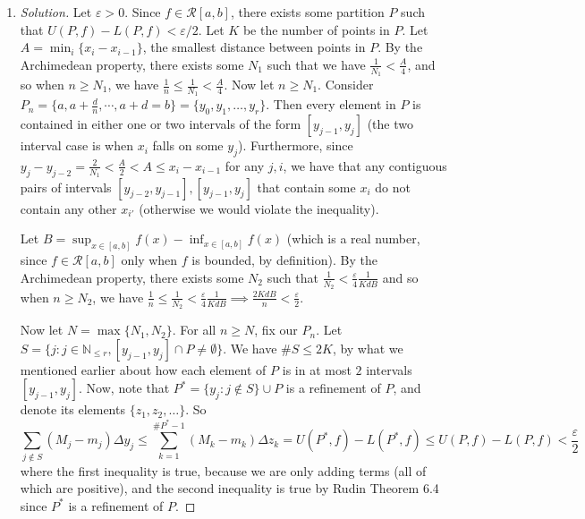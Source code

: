 \documentclass{article}
\newcommand{\N}{{\mathbb N}}
\newcommand{\ep}{{\varepsilon}}
\begin{document}
\begin{enumerate}
	\item \begin{proof}[Solution]\let\qed\relax
			Let $\ep > 0$.
			Since $f \in \mathcal{R}[a,b]$, there exists some
			partition $P$ such that $U(P,f) - L(P,f) < \ep/2$.
			Let $K$ be the number of points in $P$.
			Let $A = \min_{i}\{x_{i} - x_{i-1}\}$, the smallest distance
			between points in $P$.
			By the Archimedean property, there exists some $N_1$ such that
			we have $\frac{1}{N_1} < \frac{A}{4}$,
			and so when $n \geq N_1$, we have $\frac{1}{n} \leq \frac{1}{N_1} < \frac{A}{4}$.
			Now let $n \geq N_1$.
			Consider $P_n = \{a,a+\frac{d}{n},\cdots,a+d=b\} = \{y_0,y_1,\dots, y_r\}$.
			Then every element in $P$ is contained in either one
			or two intervals of the form $[y_{j-1},y_j]$
			(the two interval case is when $x_i$ falls on some $y_j$).
			Furthermore, since $y_j - y_{j-2} = \frac{2}{N_1} < \frac{A}{2}
			< A \leq x_i - x_{i-1}$ for any $j,i$,
			we have that any contiguous pairs of intervals $[y_{j-2},y_{j-1}],[y_{j-1},y_j]$
			that contain some $x_i$ do not contain any other $x_{i'}$
			(otherwise we would violate the inequality).

			Let $B = \sup_{x \in [a,b]} f(x) - \inf_{x \in [a,b]}f(x)$
			(which is a real number, since $f \in \mathcal{R}[a,b]$
			only when $f$ is bounded, by definition).
			By the Archimedean property, there exists some $N_2$ such that
			$\frac{1}{N_2} < \frac{\ep}{4}\frac{1}{KdB}$
			and so when $n \geq N_2$, we have
			$\frac{1}{n} \leq \frac{1}{N_2} < \frac{\ep}{4}\frac{1}{KdB}
			\implies \frac{2KdB}{n} < \frac{\ep}{2}$.
			
			Now let $N = \max\{N_1,N_2\}$.
			For all $n \geq N$, fix our $P_n$.
			Let $S = \{j \colon j\in\N_{\leq r}, [y_{j-1},y_j] \cap P \neq \emptyset\}$.
			We have $\#S \leq 2K$, by what we mentioned earlier about
			how each element of $P$ is in at most $2$ intervals $[y_{j-1},y_j]$.
			Now, note that $P^* = \{y_j \colon j \not\in S\} \cup P$ is a refinement of $P$,
			and denote its elements $\{z_1,z_2,\dots\}$.
			So
			\[
				\sum_{j \not\in S}(M_j - m_j)\Delta y_j \leq
				\sum_{k=1}^{\#P^*-1} (M_k - m_k)\Delta z_k =
				U(P^*,f) - L(P^*,f) \leq
				U(P,f) - L(P,f) < \frac{\ep}{2}
			\]
			where the first inequality is true,
			because we are only adding terms (all of which are positive),
			and the second inequality is true by Rudin Theorem 6.4
			since $P^*$ is a refinement of $P$.
			

\end{proof}
\end{enumerate}
\end{document}
